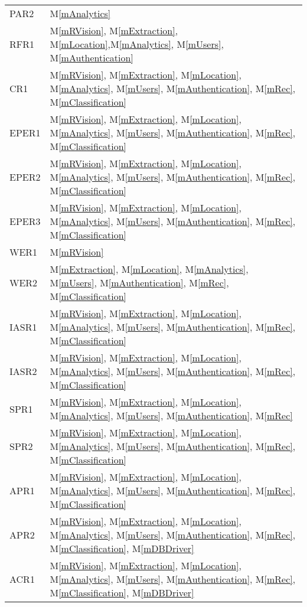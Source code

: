 \documentclass[12pt, titlepage]{article}
\newcommand{\mref}[1]{M\ref{#1}}
\begin{document}
\begin{longtable}{p{} p{}}
PAR2 & \mref{mAnalytics}\\
RFR1 & \mref{mRVision}, \mref{mExtraction}, \mref{mLocation},\mref{mAnalytics}, \mref{mUsers}, \mref{mAuthentication}\\
CR1 & \mref{mRVision}, \mref{mExtraction}, \mref{mLocation}, \mref{mAnalytics}, \mref{mUsers}, \mref{mAuthentication}, \mref{mRec}, \mref{mClassification}\\
EPER1 & \mref{mRVision}, \mref{mExtraction}, \mref{mLocation}, \mref{mAnalytics}, \mref{mUsers}, \mref{mAuthentication}, \mref{mRec}, \mref{mClassification}\\
EPER2 & \mref{mRVision}, \mref{mExtraction}, \mref{mLocation}, \mref{mAnalytics}, \mref{mUsers}, \mref{mAuthentication}, \mref{mRec}, \mref{mClassification}\\
EPER3 & \mref{mRVision}, \mref{mExtraction}, \mref{mLocation}, \mref{mAnalytics}, \mref{mUsers}, \mref{mAuthentication}, \mref{mRec}, \mref{mClassification}\\
WER1 & \mref{mRVision}\\
WER2 & \mref{mExtraction}, \mref{mLocation}, \mref{mAnalytics}, \mref{mUsers}, \mref{mAuthentication}, \mref{mRec}, \mref{mClassification}\\
IASR1 & \mref{mRVision}, \mref{mExtraction}, \mref{mLocation}, \mref{mAnalytics}, \mref{mUsers}, \mref{mAuthentication}, \mref{mRec}, \mref{mClassification}\\
IASR2 & \mref{mRVision}, \mref{mExtraction}, \mref{mLocation}, \mref{mAnalytics}, \mref{mUsers}, \mref{mAuthentication}, \mref{mRec}, \mref{mClassification}\\
SPR1 & \mref{mRVision}, \mref{mExtraction}, \mref{mLocation}, \mref{mAnalytics}, \mref{mUsers}, \mref{mAuthentication}, \mref{mRec}\\
SPR2 & \mref{mRVision}, \mref{mExtraction}, \mref{mLocation}, \mref{mAnalytics}, \mref{mUsers}, \mref{mAuthentication}, \mref{mRec}, \mref{mClassification}\\
APR1 & \mref{mRVision}, \mref{mExtraction}, \mref{mLocation}, \mref{mAnalytics}, \mref{mUsers}, \mref{mAuthentication}, \mref{mRec}, \mref{mClassification}\\
APR2 & \mref{mRVision}, \mref{mExtraction}, \mref{mLocation}, \mref{mAnalytics}, \mref{mUsers}, \mref{mAuthentication}, \mref{mRec}, \mref{mClassification}, \mref{mDBDriver}\\
ACR1 & \mref{mRVision}, \mref{mExtraction}, \mref{mLocation}, \mref{mAnalytics}, \mref{mUsers}, \mref{mAuthentication}, \mref{mRec}, \mref{mClassification}, \mref{mDBDriver}\\

\end{longtable}
\end{document}
